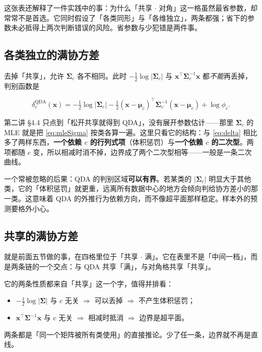 \documentclass[11pt,a4paper,fontset=windows,zihao=-4]{ctexart}
\newcommand{\bx}{\mathbf{x}}
\newcommand{\bSigma}{\boldsymbol{\Sigma}}
\newcommand{\bmu}{\boldsymbol{\mu}}
\newcommand{\tp}{^{\top}}
\newcommand{\abs}[1]{\lvert #1\rvert}
\begin{document}
这张表还解释了一件实践中的事：为什么「共享 $\cdot$ 对角」这一格虽然最省参数，却常常不是首选。它同时假设了「各类同形」与「各维独立」，两条都强；省下的参数未必抵得上两次判断错误的风险。省参数与少犯错是两件事。

\subsection{各类独立的满协方差}

去掉「共享」，允许 $\bSigma_c$ 各不相同。此时 $-\frac12\log\abs{\bSigma_c}$ 与 $\bx\tp\bSigma_c^{-1}\bx$ 都\emph{不能}再丢掉，判别函数是

\begin{equation}
  \delta_c^{\mathrm{QDA}}(\bx)
  =-\tfrac12\log\abs{\bSigma_c}
  -\tfrac12(\bx-\bmu_c)\tp\bSigma_c^{-1}(\bx-\bmu_c)+\log\phi_c .
  \label{eq:qda}
\end{equation}

第二讲 §4.4 只点到「松开共享就得到 QDA」，没有展开参数估计——那里 $\bSigma_c$ 的 MLE 就是把 \eqref{eq:mleSigma} 按类各算一遍。这里只看它的结构：与 \eqref{eq:delta} 相比多了两样东西，\textbf{一个依赖 $c$ 的行列式项}（体积惩罚）与\textbf{一个依赖 $c$ 的二次型}。两项都随 $c$ 变，所以相减时消不掉，边界成了两个二次型相等——一般是一条二次曲线。

一个常被忽略的后果：QDA 的判别区域\textbf{可以有界}。若某类的 $\abs{\bSigma_c}$ 明显大于其他类，它的「体积惩罚」就更重，远离所有数据中心的地方会倾向判给协方差小的那一类。这意味着 QDA 的外推行为依赖方向，而不像超平面那样稳定。样本外的预测要格外小心。

\subsection{共享的满协方差}

就是前面五节做的事，在四格里位于「共享 $\cdot$ 满」。它在表里不是「中间一档」，而是两条链的一个交点：与 QDA 共享「满」，与对角格共享「共享」。

它的两条性质都来自「共享」这一个字，值得并排看：

\begin{itemize}
  \item $-\frac12\log\abs{\bSigma}$ 与 $c$ 无关 $\Rightarrow$ 可以丢掉 $\Rightarrow$ 不产生体积惩罚；
  \item $\bx\tp\bSigma^{-1}\bx$ 与 $c$ 无关 $\Rightarrow$ 相减时抵消 $\Rightarrow$ 边界是超平面。
\end{itemize}

两条都是「同一个矩阵被所有类使用」的直接推论。少了任一条，边界就不再是直线。
\end{document}

